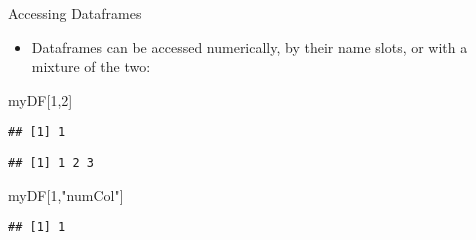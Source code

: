 \documentclass[
  ignorenonframetext,
  aspectratio=169]{beamer}
\newenvironment{Shaded}{\begin{snugshade}}{\end{snugshade}}
\newcommand{\CommentTok}[1]{\textcolor[rgb]{0.56,0.35,0.01}{\textit{#1}}}
\newcommand{\DecValTok}[1]{\textcolor[rgb]{0.00,0.00,0.81}{#1}}
\newcommand{\NormalTok}[1]{#1}
\newcommand{\SpecialCharTok}[1]{\textcolor[rgb]{0.81,0.36,0.00}{\textbf{#1}}}
\newcommand{\StringTok}[1]{\textcolor[rgb]{0.31,0.60,0.02}{#1}}
\providecommand{\tightlist}{%
  \setlength{\itemsep}{0pt}\setlength{\parskip}{0pt}}
\begin{document}
\begin{frame}[fragile]{Accessing Dataframes}
\protect\hypertarget{accessing-dataframes}{}
\begin{itemize}[<+->]
\tightlist
\item
  Dataframes can be accessed numerically, by their name slots, or with a
  mixture of the two:
\end{itemize}

\footnotesize

\begin{Shaded}
\begin{Highlighting}[]
\NormalTok{myDF[}\DecValTok{1}\NormalTok{,}\DecValTok{2}\NormalTok{]}
\end{Highlighting}
\end{Shaded}

\begin{verbatim}
## [1] 1
\end{verbatim}

\begin{Shaded}
\end{Shaded}

\begin{verbatim}
## [1] 1 2 3
\end{verbatim}

\begin{Shaded}
\begin{Highlighting}[]
\NormalTok{myDF[}\DecValTok{1}\NormalTok{,}\StringTok{"numCol"}\NormalTok{]}
\end{Highlighting}
\end{Shaded}

\begin{verbatim}
## [1] 1
\end{verbatim}

\normalsize
\end{frame}
\end{document}

